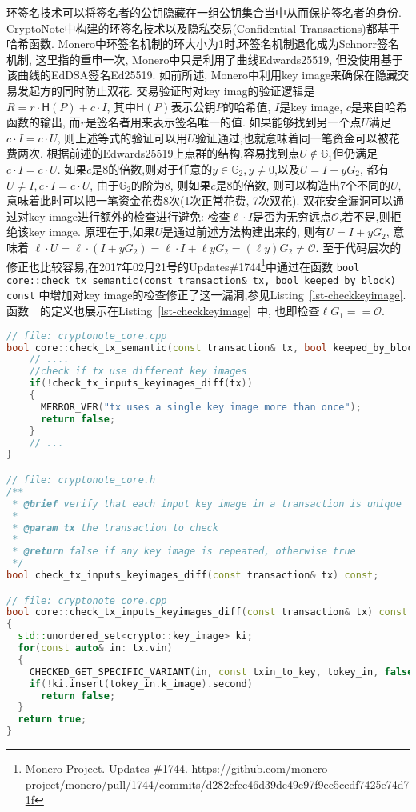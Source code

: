 \documentclass{article}
\renewcommand{\G}{\mathbb{G}}
\newcommand{\code}[1]{\lstinline!#1!}
\begin{document}
环签名技术可以将签名者的公钥隐藏在一组公钥集合当中从而保护签名者的身份.
CryptoNote中构建的环签名技术以及隐私交易(Confidential Transactions)都基于哈希函数.
Monero中环签名机制的环大小为1时,环签名机制退化成为Schnorr签名机制, 
这里指的重申一次, Monero中只是利用了曲线Edwards25519, 但没使用基于该曲线的EdDSA签名Ed25519.
如前所述, Monero中利用key image来确保在隐藏交易发起方的同时防止双花.
交易验证时对key imag的验证逻辑是$R = r\cdot \textsf{H}(P) + c\cdot I$,
其中$\textsf{H}(P)$表示公钥$P$的哈希值, $I$是key image, $c$是来自哈希函数的输出, 
而$r$是签名者用来表示签名唯一的值. 如果能够找到另一个点$U$满足$c\cdot I = c\cdot U$,
则上述等式的验证可以用$U$验证通过,也就意味着同一笔资金可以被花费两次.
根据前述的Edwards25519上点群的结构,容易找到点$U\notin\G_1$但仍满足$c\cdot I = c\cdot U$.
如果$c$是8的倍数,则对于任意的$y\in \G_2, y\neq 0$,以及$U = I + yG_2$,
都有$U\neq I,  c\cdot I = c\cdot U$, 由于$\G_2$的阶为8, 则如果$c$是8的倍数,
则可以构造出7个不同的$U$,意味着此时可以把一笔资金花费8次(1次正常花费, 7次双花).
双花安全漏洞可以通过对key image进行额外的检查进行避免: 
检查$\ell \cdot I$是否为无穷远点$\mathcal{O}$,若不是,则拒绝该key image.
原理在于,如果$U$是通过前述方法构建出来的, 则有$U = I + yG_2$, 意味着
$\ell\cdot U = \ell\cdot(I + yG_2) = \ell\cdot I + \ell y G_2 = (\ell y)G_2 \neq \mathcal{O}$.
至于代码层次的修正也比较容易,在2017年02月21号的Updates\#1744\footnote{
Monero Project. Updates \#1744.
\url{https://github.com/monero-project/monero/pull/1744/commits/d282cfcc46d39dc49e97f9ec5cedf7425e74d71f}}中通过在函数
\code{bool core::check_tx_semantic(const transaction& tx, bool keeped_by_block) const}
中增加对key image的检查修正了这一漏洞,参见Listing~\ref{lst-checkkeyimage}. 
函数~\code{}~的定义也展示在Listing~\ref{lst-checkkeyimage}~中, 
也即检查$\ell G_1 == \mathcal{O}$.

\begin{lstlisting}[language=c++, caption=检查key image的唯一性, label=lst-checkkeyimage]
// file: cryptonote_core.cpp
bool core::check_tx_semantic(const transaction& tx, bool keeped_by_block) const{
    // .... 
    //check if tx use different key images
    if(!check_tx_inputs_keyimages_diff(tx))
    {
      MERROR_VER("tx uses a single key image more than once");
      return false;
    }
    // ... 
}

// file: cryptonote_core.h
/**
 * @brief verify that each input key image in a transaction is unique
 *
 * @param tx the transaction to check
 *
 * @return false if any key image is repeated, otherwise true
 */
bool check_tx_inputs_keyimages_diff(const transaction& tx) const;

// file: cryptonote_core.cpp
bool core::check_tx_inputs_keyimages_diff(const transaction& tx) const
{
  std::unordered_set<crypto::key_image> ki;
  for(const auto& in: tx.vin)
  {
    CHECKED_GET_SPECIFIC_VARIANT(in, const txin_to_key, tokey_in, false);
    if(!ki.insert(tokey_in.k_image).second)
      return false;
  }
  return true;
}
\end{lstlisting}
\end{document}
